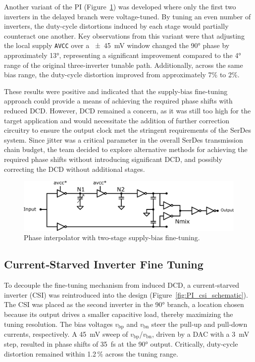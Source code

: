 Another variant of the PI (Figure~\ref{fig:PI_2_schematic}) was developed where only the first two inverters in the delayed branch were voltage-tuned. By tuning an even number of inverters, the duty-cycle distortions induced by each stage would partially counteract one another. Key observations from this variant were that adjusting the local supply \texttt{AVCC} over a \SI{\pm45}{\milli\volt} window changed the \ang{90} phase by approximately \ang{13}, representing a significant improvement compared to the \ang{4} range of the original three-inverter tunable path. Additionally, across the same bias range, the duty-cycle distortion improved from approximately 7\% to 2\%.

These results were positive and indicated that the supply-bias fine-tuning approach could provide a means of achieving the required phase shifts with reduced DCD. However, DCD remained a concern, as it was still too high for the target application and would necessitate the addition of further correction circuitry to ensure the output clock met the stringent requirements of the SerDes system. Since jitter was a critical parameter in the overall SerDes transmission chain budget, the team decided to explore alternative methods for achieving the required phase shifts without introducing significant DCD, and possibly correcting the DCD without additional stages.

\begin{figure}[H]
  \centering
  \includegraphics[width=0.8\linewidth]{figures/Schematics/clock_generation_half_V2.png}
  \caption{Phase interpolator with two-stage supply-bias fine-tuning.}
  \label{fig:PI_2_schematic}
\end{figure}

\subsection{Current‑Starved Inverter Fine Tuning}\label{sec:csi}

To decouple the fine-tuning mechanism from induced DCD, a current‑starved inverter (CSI) was reintroduced into the design (Figure~\ref{fig:PI_csi_schematic}). The CSI was placed as the second inverter in the \ang{90} branch, a location chosen because its output drives a smaller capacitive load, thereby maximizing the tuning resolution. The bias voltages $v_\text{bp}$ and $v_\text{bn}$ steer the pull‑up and pull‑down currents, respectively. A \SI{45}{\milli\volt} sweep of $v_\text{bp}$/$v_\text{bn}$, driven by a DAC with a \SI{3}{\milli\volt} step, resulted in phase shifts of \SI{35}{\femto\second} at the \ang{90} output. Critically, duty‑cycle distortion remained within 1.2\,\% across the tuning range.

